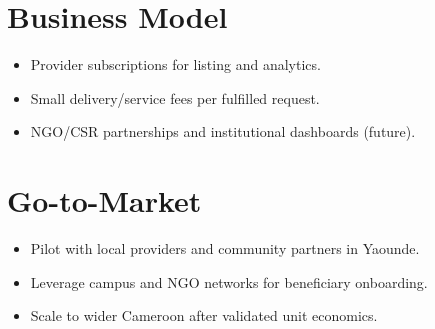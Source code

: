 \documentclass[11pt,a4paper]{article}
\begin{document}
\begin{minipage}[t]{0.48\textwidth}
\section*{Business Model}
\begin{itemize}
    \item Provider subscriptions for listing and analytics.
    \item Small delivery/service fees per fulfilled request.
    \item NGO/CSR partnerships and institutional dashboards (future).
\end{itemize}

\section*{Go-to-Market}
\begin{itemize}
    \item Pilot with local providers and community partners in Yaounde.
    \item Leverage campus and NGO networks for beneficiary onboarding.
    \item Scale to wider Cameroon after validated unit economics.
\end{itemize}
\end{minipage}
\hfill
\end{document}
